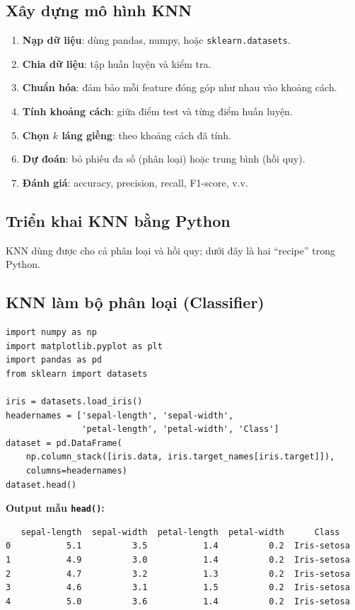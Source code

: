 \subsection{Xây dựng mô hình KNN}

\begin{phuongphap}[title={Các bước xây mô hình}]
\begin{enumerate}
  \item \textbf{Nạp dữ liệu}: dùng pandas, numpy, hoặc \texttt{sklearn.datasets}.
  \item \textbf{Chia dữ liệu}: tập huấn luyện và kiểm tra.
  \item \textbf{Chuẩn hóa}: đảm bảo mỗi feature đóng góp như nhau vào khoảng cách.
  \item \textbf{Tính khoảng cách}: giữa điểm test và từng điểm huấn luyện.
  \item \textbf{Chọn $k$ láng giềng}: theo khoảng cách đã tính.
  \item \textbf{Dự đoán}: bỏ phiếu đa số (phân loại) hoặc trung bình (hồi quy).
  \item \textbf{Đánh giá}: accuracy, precision, recall, F1-score, v.v.
\end{enumerate}
\end{phuongphap}

\subsection{Triển khai KNN bằng Python}

\begin{ynghia}[title={Classifier và Regressor}]
KNN dùng được cho cả phân loại và hồi quy; dưới đây là hai ``recipe'' trong Python.
\end{ynghia}

\subsection{KNN làm bộ phân loại (Classifier)}

\begin{vidu}[title={Import và nạp Iris}]
\begin{lstlisting}
import numpy as np
import matplotlib.pyplot as plt
import pandas as pd
from sklearn import datasets

iris = datasets.load_iris()
headernames = ['sepal-length', 'sepal-width',
               'petal-length', 'petal-width', 'Class']
dataset = pd.DataFrame(
    np.column_stack([iris.data, iris.target_names[iris.target]]),
    columns=headernames)
dataset.head()
\end{lstlisting}

\textbf{Output mẫu \texttt{head()}:}
\begin{verbatim}
   sepal-length  sepal-width  petal-length  petal-width      Class
0           5.1          3.5           1.4          0.2  Iris-setosa
1           4.9          3.0           1.4          0.2  Iris-setosa
2           4.7          3.2           1.3          0.2  Iris-setosa
3           4.6          3.1           1.5          0.2  Iris-setosa
4           5.0          3.6           1.4          0.2  Iris-setosa
\end{verbatim}
\end{vidu}

